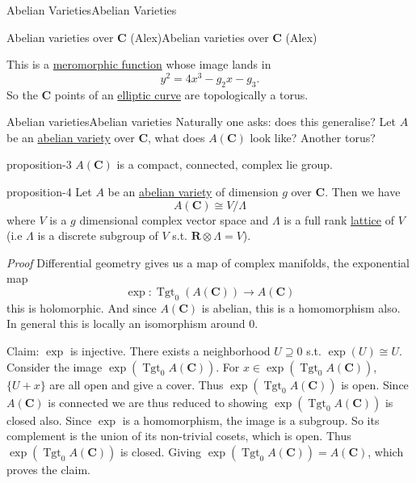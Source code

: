 \documentclass[10pt,]{book}
\makeatletter
\renewcommand*{\proofname}{Proof}
\renewenvironment{proof}[1][\proofname]{\par
  \pushQED{\qed}%
  \normalfont \topsep6\p@\@plus6\p@\relax
  \trivlist
  \item\relax
    {\itshape
    #1\@addpunct{.}}\hspace\labelsep\ignorespaces
}{%
  \popQED\endtrivlist\@endpefalse
}
\numberwithin{equation}{section}
\newcommand{\RR}{\mathbf{R}}
\newcommand{\CC}{\mathbf{C}}
\DeclareMathOperator{\Tgt}{Tgt}
\makeatother
\begin{document}
\begin{chapterptx}{Abelian Varieties}{}{Abelian Varieties}{}{}
\begin{sectionptx}{Abelian varieties over \(\CC\) (Alex)}{}{Abelian varieties over \(\CC\) (Alex)}{}{}
\begin{introduction}{}
This is a \hyperref[def-morph-riem-surf]{meromorphic function} whose image lands in%
\begin{equation*}
y^2 = 4x^3 - g_2 x - g_3\text{.}
\end{equation*}
So the \(\CC\) points of an \hyperref[def-supersing-isog-ec]{elliptic curve} are topologically a torus.%
\end{introduction}%
%
%
\typeout{************************************************}
\typeout{************************************************}
%
\begin{subsectionptx}{Abelian varieties}{}{Abelian varieties}{}{}\label{subsection-4}
\hypertarget{p-40}{}%
Naturally one asks: does this generalise? Let \(A\) be an \hyperref[def-buntes-abvar]{abelian variety} over \(\CC\), what does \(A(\CC)\) look like? Another torus?%
\begin{proposition}{}{}{proposition-3}%
\hypertarget{p-41}{}%
\(A(\CC)\) is a compact, connected, complex lie group.%
\end{proposition}
\begin{proposition}{}{}{proposition-4}%
\hypertarget{p-42}{}%
Let \(A\) be an \hyperref[def-buntes-abvar]{abelian variety} of dimension \(g\) over \(\CC\). Then we have%
\begin{equation*}
A(\CC) \cong V/\Lambda
\end{equation*}
where \(V\) is a \(g\) dimensional complex vector space and \(\Lambda\) is a full rank \hyperref[def-buntes-lattice]{lattice} of \(V\) (i.e \(\Lambda\) is a discrete subgroup of \(V\) s.t. \(\RR\otimes \Lambda  = V\)).%
\end{proposition}
\begin{proof}\hypertarget{proof-8}{}
\hypertarget{p-43}{}%
Differential geometry gives us a map of complex manifolds, the exponential map%
\begin{equation*}
\exp\colon\Tgt_0(A(\CC)) \to A(\CC)
\end{equation*}
this is holomorphic. And since \(A(\CC)\) is abelian, this is a homomorphism also. In general this is locally an isomorphism around 0.%
\par
\hypertarget{p-44}{}%
Claim: \(\exp\) is injective. There exists a neighborhood \(U\supseteq 0\) s.t. \(\exp(U) \cong U\). Consider the image \(\exp(\Tgt_0 A(\CC))\). For \(x\in \exp(\Tgt_0 A(\CC))\), \(\{U+x\}\) are all open and give a cover. Thus \(\exp(\Tgt_0A(\CC))\) is open. Since \(A(\CC)\) is connected we are thus reduced to showing \(\exp(\Tgt_0 A(\CC))\) is closed also. Since \(\exp\) is a homomorphism, the image is a subgroup. So its complement is the union of its non-trivial cosets, which is open. Thus \(\exp(\Tgt_0A(\CC))\) is closed. Giving \(\exp(\Tgt_0A(\CC)) = A(\CC)\), which proves the claim.%

\end{proof}
\end{subsectionptx}
\end{sectionptx}
\end{chapterptx}
\end{document}
